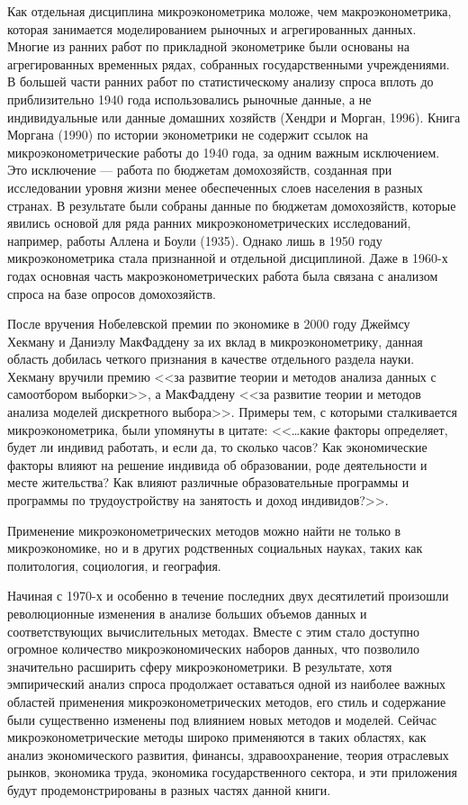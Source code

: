	Как отдельная дисциплина микроэконометрика моложе, чем макроэконометрика, которая занимается моделированием рыночных и агрегированных данных. Многие из ранних работ по прикладной эконометрике были основаны на агрегированных временных рядах, собранных государственными учреждениями. В большей части ранних работ по статистическому анализу спроса вплоть до приблизительно 1940 года использовались рыночные данные, а не индивидуальные или данные домашних хозяйств (Хендри и Морган, 1996). Книга Моргана (1990) по истории эконометрики не содержит ссылок на микроэконометрические работы до 1940 года, за одним важным исключением.  Это исключение --- работа по бюджетам домохозяйств, созданная при исследовании уровня жизни  менее обеспеченных слоев населения в разных странах. В результате были собраны данные по бюджетам домохозяйств,  которые явились основой для ряда ранних микроэконометрических исследований, например, работы Аллена и Боули (1935). Однако лишь в 1950 году микроэконометрика стала признанной и отдельной дисциплиной. Даже в 1960-х годах основная часть макроэконометрических работа была связана с анализом спроса на базе опросов домохозяйств. 
	
		
	После вручения Нобелевской премии по экономике в 2000 году Джеймсу Хекману и Даниэлу МакФаддену за их вклад в микроэконометрику, данная область добилась четкого признания в качестве отдельного раздела науки. Хекману вручили премию <<за развитие теории и методов анализа данных с самоотбором выборки>>, а МакФаддену <<за развитие теории и методов анализа моделей дискретного выбора>>. Примеры тем, с которыми сталкивается микроэконометрика, были упомянуты в цитате: <<\ldots какие факторы определяет, будет ли индивид работать, и если да, то сколько часов? Как экономические факторы влияют на решение индивида об образовании, роде деятельности и месте жительства? Как влияют различные образовательные программы и программы по трудоустройству на занятость и доход индивидов?>>.
	
		
	Применение микроэконометрических методов можно найти не только в  микроэкономике, но и в других родственных социальных науках, таких как политология, социология, и география. 
	
	
	Начиная с 1970-х и особенно в течение последних двух десятилетий произошли революционные изменения в анализе больших объемов данных и соответствующих вычислительных методах. Вместе с этим стало доступно огромное количество микроэкономических наборов данных, что позволило значительно расширить сферу микроэконометрики. 
	В результате, хотя эмпирический анализ спроса продолжает оставаться одной из наиболее важных областей применения микроэконометрических методов, его стиль и содержание были существенно изменены под влиянием новых методов и моделей. Сейчас микроэконометрические методы широко применяются в таких областях, как анализ экономического развития,  финансы, здравоохранение, теория отраслевых рынков, экономика труда, экономика государственного сектора, и эти приложения будут продемонстрированы в разных частях данной книги.
	
